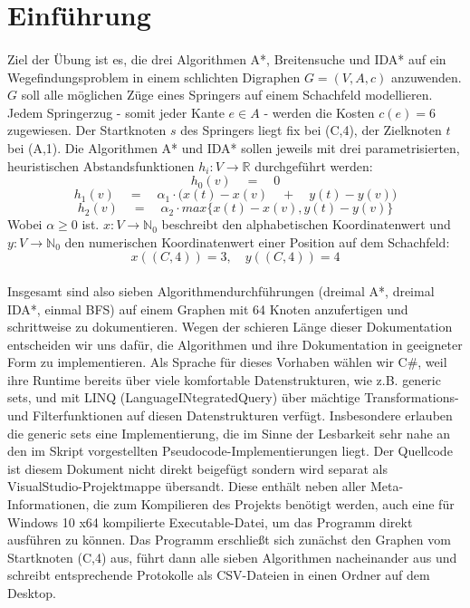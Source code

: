 \section{ Einführung }\label{se:intro}
\paragraph*{}
Ziel der Übung ist es, die drei Algorithmen A*, Breitensuche und IDA* auf ein Wegefindungsproblem in einem 
schlichten Digraphen $G = (V,A,c)$ anzuwenden. $G$ soll alle möglichen Züge eines Springers auf einem Schachfeld
modellieren. Jedem Springerzug - somit jeder Kante $e \in A$ - werden die Kosten $c(e) = 6$ zugewiesen. Der 
Startknoten $s$ des Springers liegt fix bei (C,4), der Zielknoten $t$ bei (A,1). Die Algorithmen A* und IDA* 
sollen jeweils mit drei parametrisierten, heuristischen Abstandsfunktionen $h_i: V \rightarrow \mathbb{R}$ 
durchgeführt werden:
\[ h_0(v) \quad = \quad 0 \]
\[ h_1(v) \quad = \quad \alpha_1\cdot\Big( x(t)-x(v) \quad+\quad y(t)-y(v) \Big) \]
\[ h_2(v) \quad = \quad \alpha_2\cdot max\{x(t)-x(v), y(t)-y(v)\} \]
Wobei $\alpha \geq 0$ ist. $x: V \rightarrow \mathbb{N}_0$ beschreibt den alphabetischen Koordinatenwert und 
$y: V \rightarrow \mathbb{N}_0$ den numerischen Koordinatenwert einer Position auf dem Schachfeld:
\[ x((C,4)) = 3, \quad y((C,4)) = 4 \]

\paragraph*{}
Insgesamt sind also sieben Algorithmendurchführungen (dreimal A*, dreimal IDA*, einmal BFS) auf einem Graphen 
mit 64 Knoten anzufertigen und schrittweise zu dokumentieren. Wegen der schieren Länge dieser Dokumentation 
entscheiden wir uns dafür, die Algorithmen und ihre Dokumentation in geeigneter Form zu implementieren. Als 
Sprache für dieses Vorhaben wählen wir C\#, weil ihre Runtime bereits über viele komfortable Datenstrukturen, 
wie z.B. generic sets, und mit LINQ (LanguageINtegratedQuery) über mächtige Transformations- und 
Filterfunktionen auf diesen Datenstrukturen verfügt. Insbesondere erlauben die generic sets eine Implementierung, 
die im Sinne der Lesbarkeit sehr nahe an den im Skript vorgestellten Pseudocode-Implementierungen liegt. Der 
Quellcode ist diesem Dokument nicht direkt beigefügt sondern wird separat als VisualStudio-Projektmappe übersandt.
Diese enthält neben aller Meta-Informationen, die zum Kompilieren des Projekts benötigt werden, auch eine für 
Windows 10 x64 kompilierte Executable-Datei, um das Programm direkt ausführen zu können. Das Programm erschließt 
sich zunächst den Graphen vom Startknoten (C,4) aus, führt dann alle sieben Algorithmen nacheinander aus und 
schreibt entsprechende Protokolle als CSV-Dateien in einen Ordner auf dem Desktop.
